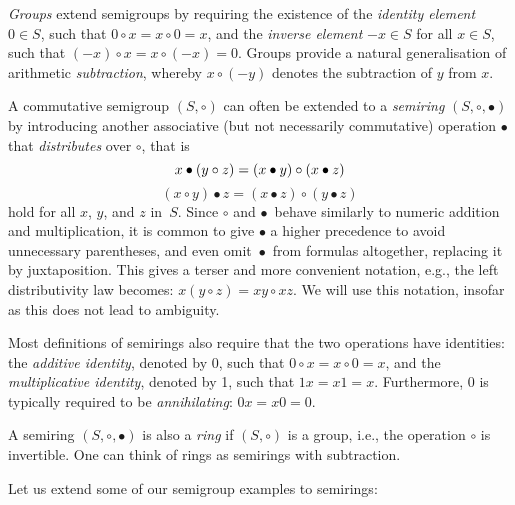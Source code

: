 \emph{Groups} extend semigroups by requiring the existence of the \emph{identity
element} $0 \in S$, such that $0 \circ x = x \circ 0=x$, and the \emph{inverse
element} $-x \in S$ for all $x \in S$, such that
$(-x) \circ x = x \circ (-x) = 0$. Groups provide a natural generalisation of
arithmetic \emph{subtraction}, whereby $x \circ (-y)$ denotes the subtraction of
$y$ from $x$.

A commutative semigroup $(S, \circ)$ can often be extended to a \emph{semiring}
$(S, \circ, \bullet)$ by introducing another associative (but not necessarily
commutative) operation $\bullet$ that \emph{distributes} over $\circ$, that is
\[
x \bullet (y \circ z) = (x \bullet y) \circ (x \bullet z)\\
\]
\[
(x \circ y) \bullet z = (x \bullet z) \circ (y \bullet z)
\]
hold for all $x$, $y$, and $z$ in~$S$. Since $\circ$ and $\bullet$~behave
similarly to numeric addition and multiplication, it is common to give $\bullet$
a higher precedence to avoid unnecessary parentheses, and even omit~$\bullet$~from
formulas altogether, replacing it by juxtaposition. This gives a terser and
more convenient notation, e.g., the left distributivity law becomes:
$x (y \circ z) = x y \circ x z$. We will use this notation, insofar as this does
not lead to ambiguity.

Most definitions of semirings also require that the two operations have
identities: the \emph{additive identity}, denoted by 0, such that
$0 \circ x = x \circ 0=x$, and the \emph{multiplicative identity}, denoted by 1,
such that $1x=x1=x$. Furthermore, 0 is typically required to be
\emph{annihilating}: $0x=x0=0$.

A semiring $(S, \circ, \bullet)$ is also a \emph{ring} if $(S, \circ)$ is a
group, i.e., the operation $\circ$ is invertible. One can think of rings as
semirings with subtraction.

Let us extend some of our semigroup examples to semirings:

